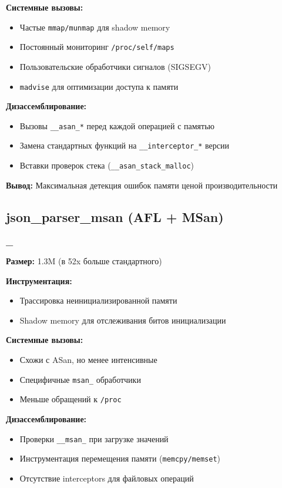 \textbf{Системные вызовы:}
  \begin{itemize}
  \item Частые \texttt{mmap/munmap} для shadow memory
  \item Постоянный мониторинг \texttt{/proc/self/maps}
  \item Пользовательские обработчики сигналов (SIGSEGV)
  \item \texttt{madvise} для оптимизации доступа к памяти
  \end{itemize}

\textbf{Дизассемблирование:}
  \begin{itemize}
  \item Вызовы \texttt{\_\_asan\_*} перед каждой операцией с памятью
  \item Замена стандартных функций на \texttt{\_\_interceptor\_*} версии
  \item Вставки проверок стека (\texttt{\_\_asan\_stack\_malloc})
  \end{itemize}

\textbf{Вывод:} Максимальная детекция ошибок памяти ценой производительности


\subsection{json\_parser\_msan (AFL + MSan)}
\textbf{\_}

\textbf{Размер:} 1.3M (в 52x больше стандартного)

\textbf{Инструментация:}
  \begin{itemize}
  \item Трассировка неинициализированной памяти
  \item Shadow memory для отслеживания битов инициализации
  \end{itemize}

\textbf{Системные вызовы:}
  \begin{itemize}
  \item Схожи с ASan, но менее интенсивные
  \item Специфичные \texttt{msan\_} обработчики
  \item Меньше обращений к \texttt{/proc}
  \end{itemize}

\textbf{Дизассемблирование:}
  \begin{itemize}
  \item Проверки \texttt{\_\_msan\_} при загрузке значений
  \item Инструментация перемещения памяти (\texttt{memcpy/memset})
  \item Отсутствие interceptors для файловых операций
  \end{itemize}

